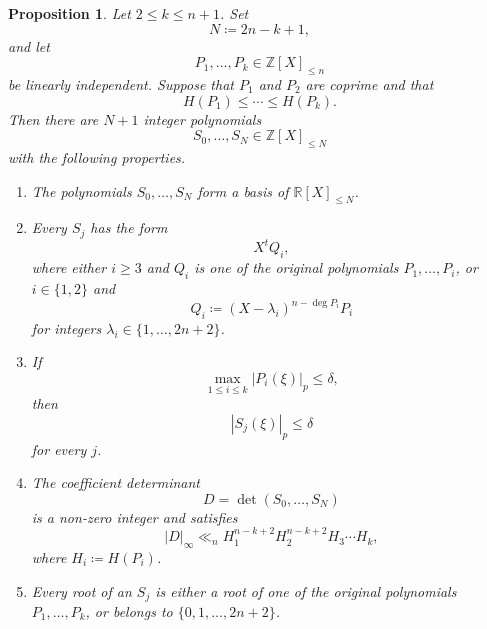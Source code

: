 \documentclass[10pt,a4paper]{amsart}
\newtheorem{proposition}[theorem]{Proposition}
\newcommand{\Z}{\mathbb Z}
\newcommand{\R}{\mathbb R}
\begin{document}
\begin{proposition}\label{prop:generalized-basis}
Let $2\leq k\leq n+1$. Set
$$
N\coloneqq2n-k+1,
$$
and let
$$
P_1,\ldots,P_k\in\Z[X]_{\leq n}
$$
be linearly independent. Suppose that $P_1$ and $P_2$ are coprime and that
$$
H(P_1)\leq\cdots\leq H(P_k).
$$
Then there are $N+1$ integer polynomials
$$
S_0,\ldots,S_N\in\Z[X]_{\leq N}
$$
with the following properties.

\begin{enumerate}[label=\textup{(\roman*)}]
\item The polynomials $S_0,\ldots,S_N$ form a basis of $\R[X]_{\leq N}$.

\item Every $S_j$ has the form
$$
X^tQ_i,
$$
where either $i\geq3$ and $Q_i$ is one of the original polynomials $P_1,\ldots,P_i$, or $i\in\{1,2\}$ and
$$
Q_i\coloneqq(X-\lambda_i)^{n-\deg P_i}P_i
$$
for integers $\lambda_i\in\{1,\ldots,2n+2\}$.

\item If
$$
\max_{1\leq i\leq k}|P_i(\xi)|_p\leq\delta,
$$
then
$$
|S_j(\xi)|_p\leq\delta
$$
for every $j$.

\item The coefficient determinant
$$
D=\det(S_0,\ldots,S_N)
$$
is a non-zero integer and satisfies
$$
|D|_\infty
\ll_n
H_1^{n-k+2}H_2^{n-k+2}H_3\cdots H_k,
$$
where $H_i\coloneqq H(P_i)$.

\item Every root of an $S_j$ is either a root of one of the original
polynomials $P_1,\ldots,P_k$, or belongs to
$\{0,1,\ldots,2n+2\}$.
\end{enumerate}
\end{proposition}
\end{document}
